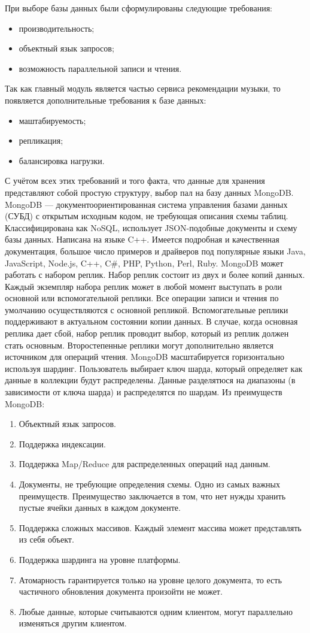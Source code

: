 При выборе базы данных были сформулированы следующие требования:
\begin{itemize}
\item производительность;
\item объектный язык запросов;
\item возможность параллельной записи и чтения.
\end{itemize}
Так как главный модуль является частью сервиса рекомендации музыки, то появляется дополнительные требования к базе данных:
\begin{itemize}
\item маштабируемость;
\item репликация;
\item балансировка нагрузки.
\end{itemize}
С учётом всех этих требований и того факта, что данные для хранения представляют собой простую структуру, выбор пал на базу данных MongoDB.
MongoDB — документоориентированная система управления базами данных (СУБД) с открытым исходным кодом, не требующая описания схемы таблиц. Классифицирована как NoSQL, использует JSON-подобные документы и схему базы данных. Написана на языке C++. Имеется подробная и качественная документация, большое число примеров и драйверов под популярные языки Java, JavaScript, Node.js, C++, 	C\#, PHP, Python, Perl, Ruby.
MongoDB может работать с набором реплик. Набор реплик состоит из двух и более копий данных. Каждый экземпляр набора реплик может в любой момент выступать в роли основной или вспомогательной реплики. Все операции записи и чтения по умолчанию осуществляются с основной репликой. Вспомогательные реплики поддерживают в актуальном состоянии копии данных. В случае, когда основная реплика дает сбой, набор реплик проводит выбор, который из реплик должен стать основным. Второстепенные реплики могут дополнительно является источником для операций чтения. MongoDB масштабируется горизонтально используя шардинг. Пользователь выбирает ключ шарда, который определяет как данные в коллекции будут распределены. Данные разделятюся на диапазоны (в зависимости от ключа шарда) и распределятся по шардам.
Из преимуществ MongoDB:
\begin{enumerate}[label=\arabic*.]
\item Объектный язык запросов.
\item Поддержка индексации.
\item Поддержка Map/Reduce для распределенных операций над данным.
\item Документы, не требующие определения схемы. Одно из самых важных преимуществ. Преимущество заключается в том, что нет нужды хранить пустые ячейки данных в каждом документе.
\item Поддержка сложных массивов. Каждый элемент массива может представлять из себя объект.
\item Поддержка шардинга на уровне платформы.
\item Атомарность гарантируется только на уровне целого документа, то есть частичного обновления документа произойти не может.
\item Любые данные, которые считываются одним клиентом, могут параллельно изменяться другим клиентом.
\end{enumerate}
